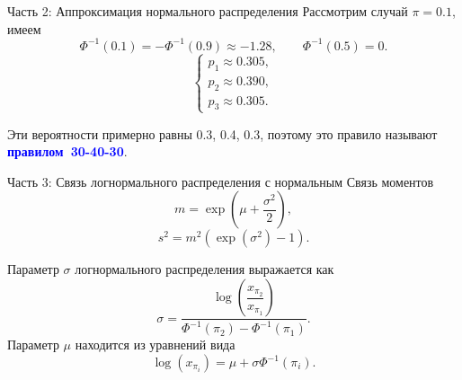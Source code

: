 \documentclass[ucs, notheorems, handout]{beamer}
\begin{document}
\begin{frame}{Часть 2: Аппроксимация нормального распределения}
	Рассмотрим случай $\pi = 0.1$, имеем 
	$$\Phi ^{-1}(0.1) = -\Phi ^{-1}(0.9) \approx  -1.28, \qquad \Phi ^{-1}(0.5) = 0. $$
	\begin{equation*}
		\begin{cases}
			p_{1}\approx 0.305, \\ 
			p_{2}\approx 0.390,  \\ 
			p_{3}\approx 0.305.
		\end{cases}
	\end{equation*}
	
	Эти вероятности примерно равны 0.3, 0.4, 0.3, поэтому это правило называют \textcolor{blue}{\hbox{\textbf{правилом 30-40-30}}}.
	
\end{frame}	

\begin{frame}{Часть 3: Связь логнормального распределения с нормальным}
	Связь моментов
	\begin{equation*}
		m = \exp\left( \mu+\frac{\sigma ^{2}}{2}\right) ,
	\end{equation*} \label{10}
	\begin{equation*}
		s^{2} = m^{2}(\exp(\sigma^{2})-1).
	\end{equation*} \label{11}
	
	Параметр $\sigma$ логнормального распределения выражается как
	\begin{equation*}
		\displaystyle{\sigma = \dfrac{\log\left(\dfrac{x_{\pi_{2}}}{x_{\pi_{1}}}\right)}{\Phi ^{-1}(\pi_{2}) - \Phi ^{-1}(\pi_{1})}}.
	\end{equation*} \label{13}
	Параметр $\mu$ находится из уравнений вида
	\begin{equation*}
		\log(x_{\pi_{i}}) = \mu + \sigma\Phi ^{-1}(\pi_{i}).
	\end{equation*}
\end{frame}
\end{document}
